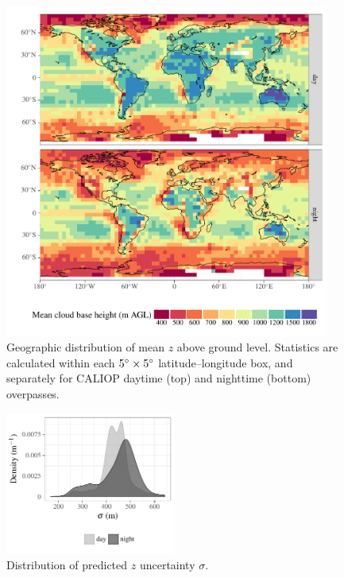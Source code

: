 \documentclass[essd,manuscript]{copernicus}\usepackage[]{graphicx}\usepackage[]{color}
\newenvironment{knitrout}{}{} %
\newcommand\CBH{\ensuremath{z}}
\begin{document}
\begin{figure}
  \centering
\begin{knitrout}
\color{fgcolor}

{\centering \includegraphics[width=0.95\textwidth]{figure/method-cbase-base-1} 

}



\end{knitrout}
  \caption{Geographic distribution of mean \CBH{} above ground
    level.  Statistics are calculated within each $5^{\circ}\times 5^{\circ}$
    latitude--longitude box, and separately for CALIOP daytime (top) and
  nighttime (bottom)
    overpasses.}
  \label{fig:geo}
\end{figure}

\begin{figure}
  \centering
\begin{knitrout}
\color{fgcolor}

{\centering \includegraphics[width=0.5\textwidth]{figure/method-cbase-rmse-1} 

}



\end{knitrout}
  \caption{Distribution of predicted \CBH{} uncertainty $\sigma$.}
  \label{fig:uncertainty}
\end{figure}
\end{document}
